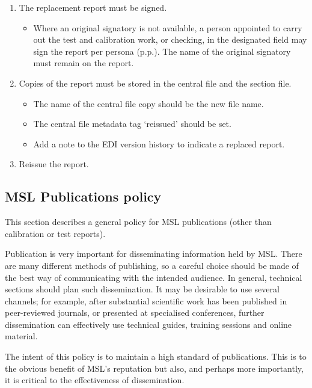 {\begin{enumerate}
\item The replacement report must be signed.
\begin{itemize}
\item Where an original signatory is not available, a person appointed to carry out the test and calibration work, or checking, in the designated field may sign the report per persona (p.p.).  The name of the original signatory must remain on the report.
\end{itemize}

\item Copies of the report must be stored in the central file and the section file.
\begin{itemize}
\item The name of the central file copy should be the new file name. 
\item The central file metadata tag `reissued' should be set.
\item Add a note to the EDI version history to indicate a replaced report.
\end{itemize}
\item Reissue the report.

\end{enumerate}


}

\subsection{MSL Publications policy}
\label{ss:msl_publications_policy}

This section describes a general policy for MSL publications (other than calibration or test reports). 

Publication is very important for disseminating information held by MSL. There are many different methods of publishing, so a careful choice should be made of the best way of communicating with the intended audience. In general, technical sections should plan such dissemination. It may be desirable to use several channels; for example, after substantial scientific work has been published in peer-reviewed journals, or presented at specialised conferences, further dissemination can effectively use technical guides, training sessions and online material. 

The intent of this policy is to maintain a high standard of publications. This is to the obvious benefit of MSL’s reputation but also, and perhaps more importantly, it is critical to the effectiveness of dissemination. 

